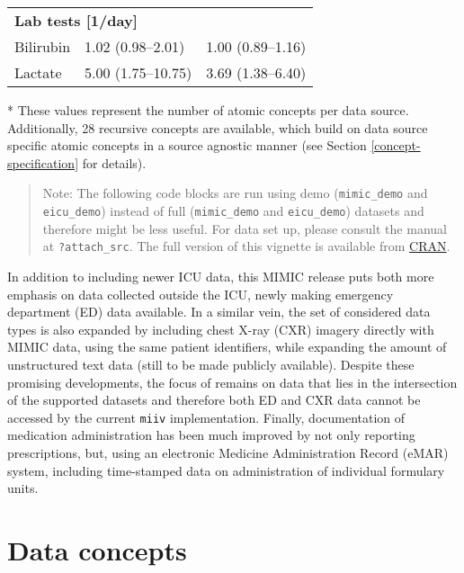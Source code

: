 \documentclass[
  notitle,
  nojss,
  noheadings]{jss}
\begin{document}
\begin{table}
\begin{threeparttable}
\begin{tabular}[t]{lll}
\multicolumn{3}{l}{\textbf{Lab tests [1/day]}}\\
\hspace{1em}Bilirubin & 1.02 (0.98--2.01) & 1.00 (0.89--1.16)\\
\hspace{1em}Lactate & 5.00 (1.75--10.75) & 3.69 (1.38--6.40)\\
\bottomrule
\end{tabular}
\begin{tablenotes}
\item[*] These values represent the number of atomic concepts per data source. Additionally, 28 recursive concepts are available, which build on data source specific atomic concepts in a source agnostic manner (see Section \ref{concept-specification} for details).
\end{tablenotes}
\end{threeparttable}
\end{table}

\begin{quote}
Note: The following code blocks are run using demo (\texttt{mimic\_demo}
and \texttt{eicu\_demo}) instead of full (\texttt{mimic\_demo} and
\texttt{eicu\_demo}) datasets and therefore might be less useful. For
data set up, please consult the manual at \texttt{?attach\_src}. The
full version of this vignette is available from
\href{https://CRAN.R-project.org/package=ricu/vignettes/jss.pdf}{CRAN}.
\end{quote}

In addition to including newer ICU data, this MIMIC release puts both
more emphasis on data collected outside the ICU, newly making emergency
department (ED) data available. In a similar vein, the set of considered
data types is also expanded by including chest X-ray (CXR) imagery
directly with MIMIC data, using the same patient identifiers, while
expanding the amount of unstructured text data (still to be made
publicly available). Despite these promising developments, the focus of
 remains on data that lies in the intersection of the
supported datasets and therefore both ED and CXR data cannot be accessed
by the current \texttt{miiv} implementation. Finally, documentation of
medication administration has been much improved by not only reporting
prescriptions, but, using an electronic Medicine Administration Record
(eMAR) system, including time-stamped data on administration of
individual formulary units.

\hypertarget{data-concepts}{%
\section{Data concepts}\label{data-concepts}}
\end{document}
